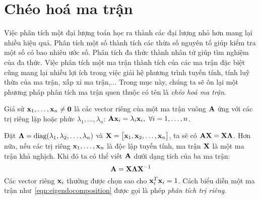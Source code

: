 


\section{Chéo hoá ma trận} %
\label{sec:cheo_hoa_ma_tran}

Việc phân tích một đại lượng toán học ra thành các đại lượng nhỏ hơn mang lại
nhiều hiệu quả. Phân tích một số thành tích các thừa số nguyên tố giúp kiểm tra
một số có bao nhiêu ước số. Phân tích đa thức thành nhân tử giúp tìm nghiệm của
đa thức. Việc phân tích một ma trận thành tích của các ma trận đặc biệt cũng mang lại nhiều lợi ích trong việc giải hệ phương trình tuyến tính,
tính luỹ thừa của ma trận, xấp xỉ ma trận,... Trong mục này, chúng ta sẽ ôn
lại một phương pháp phân tích ma trận quen thuộc có tên là \textit{chéo hoá ma
trận}.

Giả sử $\mathbf{x}_1, \dots, \mathbf{x}_n \neq \mathbf{0}$ là các vector riêng của một ma trận
vuông $\mathbf{A}$ ứng với các trị riêng lặp hoặc phức $\lambda_1, \dots, \lambda_n$:
\begin{math}
\mathbf{A}\mathbf{x}_i = \lambda_i \mathbf{x}_i, ~\forall i = 1, \dots, n
\end{math}.

Đặt $\boldsymbol{\Lambda} = \text{diag}(\lambda_1, \lambda_2, \dots, \lambda_n)$ và
$\mathbf{X} = \left[\begin{matrix} \mathbf{x}_1, \mathbf{x}_2, \dots, \mathbf{x}_n \end{matrix}\right]$, ta sẽ có $\mathbf{A}\mathbf{X} = \mathbf{X}\boldsymbol{\Lambda}$.
Hơn nữa, nếu các trị riêng $\mathbf{x}_1, \dots, \mathbf{x}_n$ là độc lập tuyến tính, ma trận
$\mathbf{X}$ là một ma trận khả nghịch. Khi đó ta có thể viết $\mathbf{A}$ dưới dạng tích của
ba ma trận:
\begin{equation}
\label{eqn:eigendocomposition}
\mathbf{A} = \mathbf{X}\boldsymbol{\Lambda}\mathbf{X}^{-1}
\end{equation}
Các vector riêng $\mathbf{x}_i$ thường được chọn sao cho $\mathbf{x}_i^T\mathbf{x}_i = 1$. Cách biểu
diễn một ma trận như~\eqref{eqn:eigendocomposition} được gọi là phép
\textit{phân tích trị riêng}.

